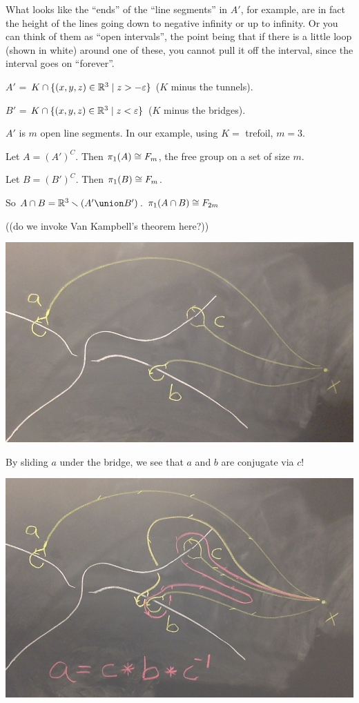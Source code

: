 \documentclass[11pt,leqno,oneside]{amsart}
\numberwithin{thm}{section}
\newcommand{\minus}{\smallsetminus}
\renewcommand{\epsilon}{\varepsilon}
\newcommand{\fund}{\pi_1}
\begin{document}
\begin{example}
  What looks like the ``ends'' of the ``line segments'' in $A'$, for
  example, are in fact the height of the lines going down to negative
  infinity or up to infinity.  Or you can think of them as ``open
  intervals'', the point being that if there is a little loop (shown
  in white) around one of these, you cannot pull it off the interval,
  since the interval goes on ``forever''.

  $A'$ = $K \cap \{(x,y,z) \in \R^3 \mid z > -\epsilon\}$ ($K$ minus
  the tunnels).

  $B'$ = $K \cap \{(x,y,z) \in \R^3 \mid z < \epsilon\}$ ($K$ minus
  the bridges).

  $A'$ is $m$ open line segments.  In our example, using $K =$
  trefoil, $m = 3$.

  Let $A = (A')^C$.  Then $\fund(A) \isom F_m$, the free group on a
  set of size $m$.

  Let $B = (B')^C$.  Then $\fund(B) \isom F_m$.

  So $A \cap B = \R^3 \minus (A' \union B')$.
  $\fund(A \cap B) \isom F_{2m}$

  ((do we invoke Van Kampbell's theorem here?))

  \includegraphics[scale=0.2]{images/mountains.jpg}

  By sliding $a$ under the bridge, we see that $a$ and $b$ are
  conjugate via $c$!

  \includegraphics[scale=0.2]{images/mountains-with-explanation.jpg}


\end{example}
\end{document}
